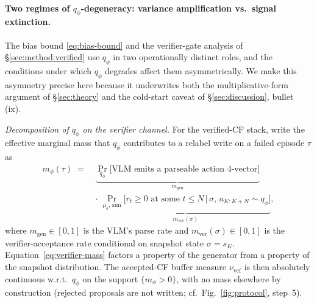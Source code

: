 \paragraph{Two regimes of $q_\phi$-degeneracy: variance amplification vs.\ signal extinction.}
The bias bound \eqref{eq:bias-bound} and the verifier-gate analysis of
\S\ref{sec:method:verified} use $q_\phi$ in two operationally distinct
roles, and the conditions under which $q_\phi$ degrades affect them
asymmetrically. We make this asymmetry precise here because it
underwrites both the multiplicative-form argument of \S\ref{sec:theory}
and the cold-start caveat of \S\ref{sec:discussion}, bullet (ix).

\emph{Decomposition of $q_\phi$ on the verifier channel.}
For the verified-CF stack, write the effective marginal mass that
$q_\phi$ contributes to a relabel write on a failed episode $\tau$ as
\begin{equation}
\begin{aligned}
  m_\phi(\tau) \;=\;& \underbrace{\Pr_{q_\phi}\!\bigl[\text{VLM emits a parseable action 4-vector}\bigr]}_{m_{\text{gen}}} \\
  &\cdot\;
  \underbrace{\Pr_{\mu_b,\,\text{sim}}\!\bigl[r_t\!\ge\!0\text{ at some }t\!\le\!N\,\big|\,\sigma,\,a_{K:K+N}\!\sim\!q_\phi\bigr]}_{m_{\text{ver}}(\sigma)},
\end{aligned}
\label{eq:verifier-mass}
\end{equation}
where $m_{\text{gen}}\!\in\![0,1]$ is the VLM's parse rate and
$m_{\text{ver}}(\sigma)\!\in\![0,1]$ is the verifier-acceptance rate
conditional on snapshot state $\sigma\!=\!s_K$. Equation~\eqref{eq:verifier-mass}
factors a property of the generator from a property of the snapshot
distribution. The accepted-CF buffer measure $\nu_{\text{vcf}}$ is then
absolutely continuous w.r.t.\ $q_\phi$ on the support
$\{m_\phi>0\}$, with no mass elsewhere by construction
(rejected proposals are not written; cf.\ Fig.~\ref{fig:protocol},
step~5).

